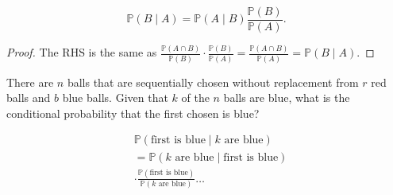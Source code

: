 \begin{lemma}
	\[
		\mathbb{P}(B\mid A)=\mathbb{P}(A\mid B)\frac{\mathbb{P}(B)}{\mathbb{P}(A)}
	.\] 
\end{lemma}
\begin{proof}
	The RHS is the same as \( \frac{\mathbb{P}(A \cap B)}{\mathbb{P}(B)} \cdot \frac{\mathbb{P}(B)}{\mathbb{P}(A)} = \frac{\mathbb{P}(A \cap B)}{\mathbb{P}(A)} = \mathbb{P}(B\mid A) \).
\end{proof}

\begin{eg}
	There are \( n \) balls that are sequentially chosen without replacement from \( r \) red balls and \( b \) blue balls. Given that \( k \) of the \( n \) balls are blue, what is the conditional probability that the first chosen is blue?
\end{eg}
\begin{explanation}
	\begin{align*}
		& \mathbb{P}(\text{first is blue} \mid k\text{ are blue}) \\
	  &= \mathbb{P}(k\text{ are blue}\mid \text{first is blue}) \\
	  &\cdot \frac{\mathbb{P}(\text{first is blue})}{\mathbb{P}(k\text{ are blue})}\ldots  \\
	\end{align*}
\end{explanation}

